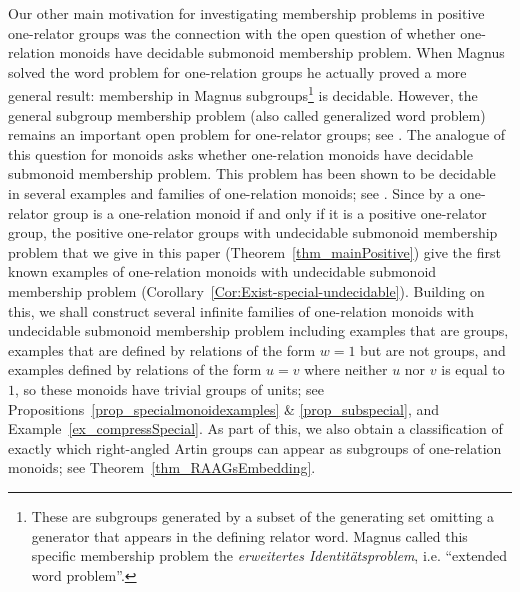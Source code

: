 \documentclass{amsart}
\theoremstyle{plain}
\theoremstyle{definition}
\begin{document}
Our other main motivation for investigating membership problems in positive one-relator groups was the connection with the open question of whether one-relation monoids have decidable submonoid membership problem. When Magnus solved the word problem for one-relation groups he actually proved a more general result: membership in Magnus subgroups\footnote{These are subgroups generated by a subset of the generating set omitting a generator that appears in the defining relator word. Magnus called this specific membership problem the \textit{erweitertes Identitätsproblem}, i.e. ``extended word problem''.} is decidable. However, the general subgroup membership problem (also called generalized word problem) remains an important open problem for one-relator groups; see \cite[Problem~18]{BooneWP}. The analogue of this question for monoids asks whether one-relation monoids have decidable submonoid membership problem. This problem has been shown to be decidable in several examples and families of one-relation monoids; see \cite{Jackson2001, Jackson2002, Kambites2009, NybergBrodda2022a, Render2009}.  
Since by \cite{Perrin1984} a one-relator group is a one-relation monoid if and only if it is a positive one-relator group, the positive one-relator groups with undecidable submonoid membership problem that we give in this paper (Theorem~\ref{thm_mainPositive}) give the first known examples of one-relation monoids with undecidable submonoid membership problem (Corollary~\ref{Cor:Exist-special-undecidable}). Building on this, we shall construct several infinite families of one-relation monoids with undecidable submonoid membership problem including examples that are groups, examples that are defined by relations of the form $w=1$ but are not groups, and examples defined by relations of the form $u=v$ where neither $u$ nor $v$ is equal to $1$, so these monoids have trivial groups of units; see Propositions~\ref{prop_specialmonoidexamples} \& \ref{prop_subspecial}, and Example~\ref{ex_compressSpecial}.  As part of this, we also obtain a classification of exactly which right-angled Artin groups can appear as subgroups of one-relation monoids; see Theorem~\ref{thm_RAAGsEmbedding}.
\end{document}

